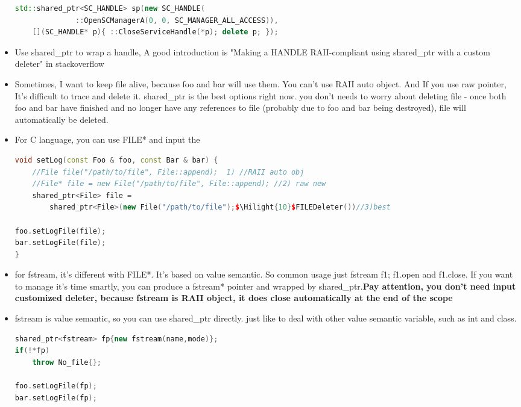 \documentclass[a4paper,11pt,twoside]{book}
\newcommand{\Hilight}[1]{\makebox[0pt][l]{\color{yellow}\rule[-3pt]{#1em}{11pt}}}
\newcommand{\Hilight}[1]{}
\begin{document}
\begin{itemize}
\begin{lstlisting}[frame=single, language=c++]
std::shared_ptr<SC_HANDLE> sp(new SC_HANDLE(
              ::OpenSCManagerA(0, 0, SC_MANAGER_ALL_ACCESS)),
	[](SC_HANDLE* p){ ::CloseServiceHandle(*p); delete p; });
\end{lstlisting}
	

	
	\item Use shared\_ptr to wrap a handle, A good introduction is "Making a HANDLE RAII-compliant using shared\_ptr with a custom deleter" in stackoverflow
	
	
	\item Sometimes, I want to keep file alive, because foo and bar will use them. You can't use RAII auto object. And If you use raw pointer, It's difficult to trace and delete it. shared\_ptr is the best options right now.  you don't needs to worry about deleting file - once both foo and bar have finished and no longer have any references to file (probably due to foo and bar being destroyed), file will automatically be deleted.
	
	\item For C language, you can use FILE* and input the 
\begin{lstlisting}[frame=single, language=c++]
void setLog(const Foo & foo, const Bar & bar) {
	//File file("/path/to/file", File::append);  1) //RAII auto obj
	//File* file = new File("/path/to/file", File::append); //2) raw new
	shared_ptr<File> file =
		shared_ptr<File>(new File("/path/to/file");$\Hilight{10}$FILEDeleter())//3)best
	
foo.setLogFile(file);
bar.setLogFile(file);
}
	\end{lstlisting}
	
	\item for fstream, it's different with FILE*. It's based on value semantic. So common usage just fstream f1; f1.open and f1.close. If you want to manage it's time smartly, you can produce a fstream* pointer and wrapped by shared\_ptr.\textbf{Pay attention, you don't need input customized deleter, because fstream is RAII object, it does close automatically at the end of the scope}
	
	\item fstream is value semantic, so you can use shared\_ptr directly. just like to deal with other value semantic variable, such as int and class.
\begin{lstlisting}[frame=single, language=c++]
shared_ptr<fstream> fp{new fstream(name,mode)};
if(!*fp)
	throw No_file{};
		
foo.setLogFile(fp);
bar.setLogFile(fp);
\end{lstlisting}

\end{itemize}
\end{document}
